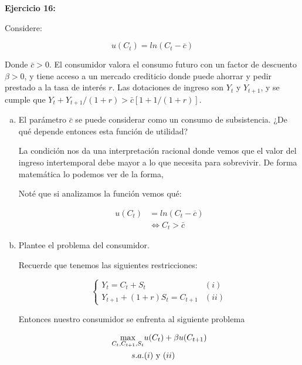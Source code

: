 \textbf{Ejercicio 16:}

Considere: 

\begin{equation}
    u(C_{t}) = ln(C_{t}-\overline{c})
\end{equation}

Donde $\bar{c}>0 .$ El consumidor valora el consumo futuro con un factor de descuento $\beta>0$, y tiene acceso a un mercado crediticio donde puede ahorrar y pedir prestado a la tasa de interés $r$. Las dotaciones de ingreso son $Y_{t}$ y $Y_{t+1}$, y se cumple que $Y_{t}+Y_{t+1} /(1+r)>\bar{c}[1+1 /(1+r)]$.

\begin{enumerate}[a)]
    \item El parámetro $\bar{c}$ se puede considerar como un consumo de subsistencia. ¿De qué depende entonces esta función de utilidad?
    
    La condición nos da una interpretación racional donde vemos que el valor del ingreso intertemporal debe mayor a lo que necesita para sobrevivir. De forma matemática lo podemos ver de la forma, 
    
    Noté que si analizamos la función vemos qué:
    
    \begin{align*}
        u(C_{t}) &= ln(C_{t}-\overline{c})\\
        & \Leftrightarrow C_{t}>\bar{c}
    \end{align*}
    
    \item Plantee el problema del consumidor.
    
    Recuerde que tenemos las siguientes restricciones:
    
    \begin{equation*}
        \begin{cases}
            Y_{t} = C_{t}+S_{t} & (i) \\
            Y_{t+1} +(1+r)S_{t} = C_{t+1} &(ii)
        \end{cases}
    \end{equation*}
    
    Entonces nuestro consumidor se enfrenta al siguiente problema
    
    \begin{align*}
        \max_{C_{t}, C_{t+1}, S_{t}} & u(C_{t})+\beta u(C_{t+1})\\
        s.a. & (i) \textup{ y }(ii) 
    \end{align*}
    

\end{enumerate}
